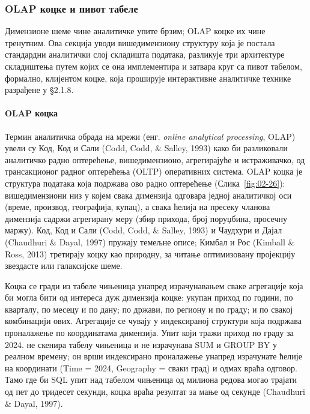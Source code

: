 \subsubsection{OLAP коцке и пивот табеле}
Димензионе шеме чине аналитичке упите брзим; OLAP коцке их чине тренутним. Ова секција уводи вишедимензиону структуру која је постала стандардни аналитички слој складишта података, разликује три архитектуре складиштења путем којих се она имплементира и затвара круг са пивот табелом, формално, клијентом коцке, која проширује интерактивне аналитичке технике разрађене у §2.1.8. 

\paragraph{OLAP коцка}
Термин аналитичка обрада на мрежи (енг. \textit{online analytical processing}, OLAP) увели су Код, Код и Сали (Codd, Codd, \& Salley, 1993) како би разликовали аналитичко радно оптерећење, вишедимензионо, агрегирајуће и истраживачко, од трансакционог радног оптерећења (OLTP) оперативних система. OLAP коцка је структура података која подржава ово радно оптерећење (Слика~\ref{fig:02-26}): вишедимензиони низ у којем свака димензија одговара једној аналитичкој оси (време, производ, географија, купац), а свака ћелија на пресеку чланова димензија садржи агрегирану меру (збир прихода, број поруџбина, просечну маржу). Код, Код и Сали (Codd, Codd, \& Salley, 1993) и Чаудхури и Дајал (Chaudhuri \& Dayal, 1997) пружају темељне описе; Кимбал и Рос (Kimball \& Ross, 2013) третирају коцку као природну, за читање оптимизовану пројекцију звездасте или галаксијске шеме.

Коцка се гради из табеле чињеница унапред израчунавањем сваке агрегације која би могла бити од интереса дуж димензија коцке: укупан приход по години, по кварталу, по месецу и по дану; по држави, по региону и по граду; и по свакој комбинацији ових. Агрегације се чувају у индексираној структури која подржава проналажење по координатама димензија. Упит који тражи приход по граду за 2024. не скенира табелу чињеница и не израчунава SUM и GROUP BY у реалном времену; он врши индексирано проналажење унапред израчунате ћелије на координати (Time = 2024, Geography = сваки град) и одмах враћа одговор. Тамо где би SQL упит над табелом чињеница од милиона редова могао трајати од пет до тридесет секунди, коцка враћа резултат за мање од секунде (Chaudhuri \& Dayal, 1997).

